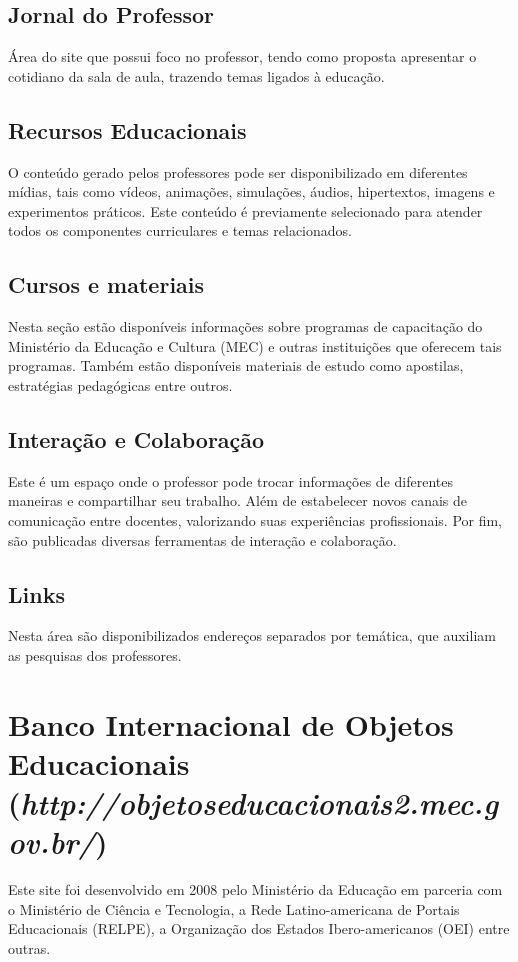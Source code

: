         \subsection{Jornal do Professor}
        Área do site que possui foco no professor, tendo como proposta
        apresentar o cotidiano da sala de aula, trazendo temas ligados à
        educação.

        \subsection{Recursos Educacionais}
        O conteúdo gerado pelos professores pode ser disponibilizado em
        diferentes mídias, tais como vídeos, animações, simulações, áudios,
        hipertextos, imagens e experimentos práticos. Este conteúdo é
        previamente selecionado para atender todos os componentes
        curriculares e temas relacionados.

        \subsection{Cursos e materiais}
        Nesta seção estão disponíveis informações sobre programas de
        capacitação do Ministério da Educação e Cultura (MEC) e outras
        instituições que oferecem tais programas. Também estão disponíveis
        materiais de estudo como apostilas, estratégias pedagógicas entre
        outros.

        \subsection{Interação e Colaboração}
        Este é um espaço onde o professor pode trocar informações de
        diferentes maneiras e compartilhar seu trabalho. Além de estabelecer
        novos canais de comunicação entre docentes, valorizando suas
        experiências profissionais. Por fim, são publicadas diversas
        ferramentas de interação e colaboração.

        \subsection{Links}
        Nesta área são disponibilizados endereços separados por temática,
        que auxiliam as pesquisas dos professores.

    \section{Banco Internacional de Objetos Educacionais
            \\(\emph{http://objetoseducacionais2.mec.gov.br/})}
    Este site foi desenvolvido em 2008 pelo Ministério da Educação em
    parceria com o Ministério de Ciência e Tecnologia, a Rede
    Latino-americana de Portais Educacionais (RELPE), a Organização dos
    Estados Ibero-americanos (OEI) entre outras.

